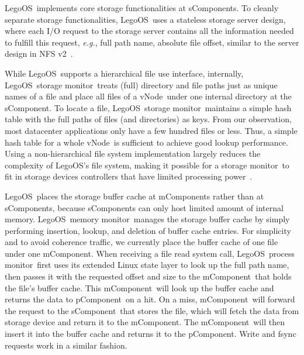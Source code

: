 \documentclass[10pt,times,twocolumn]{z2-article}
\renewcommand{\em}{\it}
\newcommand{\eg}{\textit{e.g.}}
\newcommand{\lego}{LegoOS}
\newcommand{\vnode}{vNode}
\newcommand{\microos}{monitor}
\newcommand{\pcomponent}{pComponent}
\newcommand{\mcomponent}{mComponent}
\newcommand{\scomponent}{sComponent}
\providecommand{\DIFaddtex}[1]{{\protect\color{blue}\uwave{#1}}} %
\providecommand{\DIFaddbegin}{} %
\providecommand{\DIFaddend}{} %
\providecommand{\DIFadd}[1]{\texorpdfstring{\DIFaddtex{#1}}{#1}} %
\newcommand{\DIFaddincludegraphics}[2][]{{\color{blue}\fbox{\DIFOincludegraphics[#1]{#2}}}} %
\DeclareRobustCommand{\DIFaddbegin}{\DIFOaddbegin \let\includegraphics\DIFaddincludegraphics} %
\DeclareRobustCommand{\DIFaddend}{\DIFOaddend \let\includegraphics\DIFOincludegraphics} %
\begin{document}
{{{{{{{\lego\ implements core storage functionalities at \scomponent{}s.
To cleanly separate storage functionalities, \lego\ uses a stateless storage server design, 
where each I/O request to the storage server contains all the information needed to 
fulfill this request, \eg, full path name, absolute file offset,
similar to the server design in NFS v2~\cite{Sandberg-NFS-85}.

While \lego\ supports a hierarchical file use interface,
internally, \lego\ storage \microos\ treats (full) directory and file paths just as unique names of a file
and place all files of a \vnode\ under one internal directory at the \scomponent{}.
To locate a file, \lego\ storage \microos\ maintains a simple hash table with the full paths of files (and directories) as keys.
From our observation, most datacenter applications only have a few hundred files or less.
Thus, a simple hash table for a whole \vnode\ is sufficient to achieve good lookup performance.
Using a non-hierarchical file system implementation largely reduces the complexity of \lego's file system,
making it possible for a storage \microos\ to fit in storage devices controllers that have limited processing power~\cite{Willow}.

\lego\ places the storage buffer cache at \mcomponent{}s
rather than at \scomponent{}s, because \scomponent{}s can only host limited amount of internal memory.
\lego\ memory \microos\ manages the storage buffer cache by simply performing insertion, lookup, and deletion of buffer cache entries.
For simplicity and to avoid coherence traffic, we currently place the buffer cache of one file
under one \mcomponent{}.
When receiving a file read system call, \DIFaddbegin \DIFadd{the }\DIFaddend \lego\ process \microos\ first uses its extended Linux state layer to 
look up the full path name, then passes it with the requested offset and size to the \mcomponent\ that holds the file's buffer cache.
This \mcomponent\ will look up the buffer cache and returns the data to \pcomponent\ on a hit.
On a miss, \mcomponent\ will forward the request to the \scomponent\ that stores the file, 
which will fetch the data from storage device and return it to the \mcomponent.
The \mcomponent\ will then insert it into the buffer cache and returns it to the \pcomponent.
Write and fsync requests work in a similar fashion.

}}}}}}}
\end{document}
